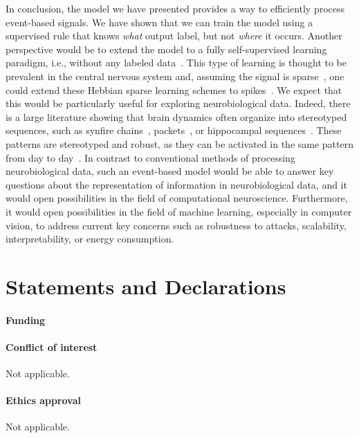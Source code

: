\documentclass[default]{sn-jnl}%
\theoremstyle{thmstyleone}%
\theoremstyle{thmstyletwo}%
\theoremstyle{thmstylethree}%
\begin{document}
In conclusion, the model we have presented provides a way to efficiently process event-based signals. We have shown that we can train the model using a supervised rule that knows \emph{what} output label, but not \emph{where} it occurs. Another perspective would be to extend the model to a fully self-supervised learning paradigm, i.e., without any labeled data~\citep{barlow_unsupervised_1989}. This type of learning is thought to be prevalent in the central nervous system and, assuming the signal is sparse~\citep{olshausen_emergence_1996}, one could extend these Hebbian sparse learning schemes to spikes~\citep{perrinet_emergence_2004, masquelier_competitive_2009}. We expect that this would be particularly useful for exploring neurobiological data. Indeed, there is a large literature showing that brain dynamics often organize into stereotyped sequences, such as synfire chains~\citep{ikegaya_synfire_2004}, packets~\citep{luczak_sequential_2007}, or hippocampal sequences~\citep{pastalkova_internally_2008, villette_internally_2015}. These patterns are stereotyped and robust, as they can be activated in the same pattern from day to day~\citep{haimerl_internal_2019}. In contrast to conventional methods of processing neurobiological data, such an event-based model would be able to answer key questions about the representation of information in neurobiological data, and it would open possibilities in the field of computational neuroscience. Furthermore, it would open possibilities in the field of machine learning, especially in computer vision, to address current key concerns such as robustness to attacks, scalability, interpretability, or energy consumption.
%
\backmatter
%
%
\Acknowledgments
%

\section*{Statements and Declarations}

\paragraph{Funding}

\Funding %

\paragraph{Conflict of interest}
Not applicable.

\paragraph{Ethics approval}
Not applicable.
\end{document}

